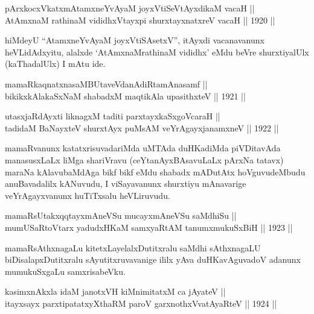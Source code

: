 
\begin{shl}
pArxkocxVkatxmAtamxneYvAyaM joyxVtiSeVtAyxdikaM vacaH || \\
AtAmxnaM rathinaM vididhxVtayxpi shurxtayxnatxreV vacaH ||  1920 ||  
\end{shl}

\begin{artha}
hiMdeyU ``AtamxneYvAyaM joyxVtiSAsetxV'', itAyxdi vacanavanunx heVLidAdxyitu, alalxde `AtAmxnaMrathinaM vididhx' eMdu beVre shurxtiyalUlx (kaThadalUlx) I mAtu ide.
\end{artha}


\begin{shl}
mamaRkaqnatxnasaMBUtaveVdanAdiRtamAnasamf || \\
bikikxkAlakaSxNaM shabadxM maqtikAla upasithxteV ||  1921 ||  
\end{shl}

\begin{shl}
utasxjaRdAyxti liknagxM taditi parxtayxkaSxgoVcaraH ||  \\
tadidaM BaNayxteV shurxtAyx puMsAM veYrAgayxjanamxneV ||  1922 ||  
\end{shl}

\begin{artha}
mamaRvanunx katatxrisuvadariMda uMTAda duHKadiMda piVDitavAda
manasusxLaLx liMga shariVravu (ceYtanAyxBAsavuLaLx pArxNa tatavx)
maraNa kAlavubaMdAga bikf bikf eMdu shabadx mADutAtx hoVguvudeMbudu
anuBavadalilx kANuvudu, I viSayavanunx shurxtiyu mAnavarige
veYrAgayxvanunx huTiTxsalu heVLiruvudu.
\end{artha}

\begin{shl}
mamaRsUtakxqqtayxmAneVSu mucayxmAneVSu saMdhiSu || \\
mumUSaRtoV\s tarx yadudxHKaM samxyaRtAM tanumxmukuSxBiH ||  1923 ||  
\end{shl}

\begin{artha}
mamaRsAthxnagaLu kitetxLayelalxDutitxralu saMdhi sAthxnagaLU
biDisalapxDutitxralu sAyutitxruvavanige ililx yAva duHKavAguvadoV
adanunx mumukuSxgaLu samxrisabeVku.
\end{artha}

\begin{shl}
kasimxnAkxla idaM janotxVH kiMnimitatxM ca jAyateV ||  \\
itayxsayx parxtipatatxyXthaRM paroV garxnothxV\s vatAyaRteV ||  1924 ||  
\end{shl}

